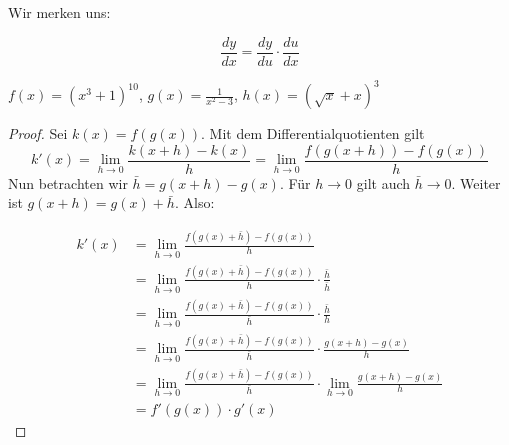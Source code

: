 Wir merken uns:
\begin{theo}
    {}
    $$\frac{dy}{dx}= \frac{dy}{du}\cdot \frac{du}{dx}$$
\end{theo}

\begin{example}
    {$f(x)= (x^3+1)^{10}$, $g(x)=\frac{1}{x^2-3}$, $h(x)=\left(\sqrt{x}+x\right)^3 $ }{}

\end{example}

\begin{proof}
    Sei $k(x) = f(g(x))$. Mit dem Differentialquotienten gilt
    $$k'(x) = \lim_{h\rightarrow0}\frac{k(x+h)-k(x)}{h} = \lim_{h\rightarrow0}\frac{f(g(x+h))-f(g(x))}{h}$$
    Nun betrachten wir $\bar h = g(x+h)-g(x)$. Für $h\rightarrow0$ gilt auch $\bar h \rightarrow 0$.  Weiter ist $g(x+h) = g(x) + \bar h$. Also:

    \begin{align*}
        k'(x) & = \lim_{h\rightarrow0} \frac{f(g(x)+\bar h) -f(g(x))}{h}                                                        \\
              & = \lim_{h\rightarrow0} \frac{f(g(x)+\bar h) -f(g(x))}{h} \cdot \frac{\bar h}{ \bar h}                           \\
              & = \lim_{h\rightarrow0} \frac{f(g(x)+\bar h) -f(g(x))}{\bar h} \cdot \frac{\bar h}{h}                            \\
              & = \lim_{h\rightarrow0} \frac{f(g(x)+\bar h) -f(g(x))}{\bar h} \cdot \frac{g(x+h)-g(x)}{ h}                      \\
              & = \lim_{h\rightarrow0} \frac{f(g(x)+\bar h) -f(g(x))}{\bar h} \cdot \lim_{h\rightarrow0} \frac{g(x+h)-g(x)}{ h} \\
              & = f'(g(x)) \cdot g'(x)
    \end{align*}
\end{proof}

